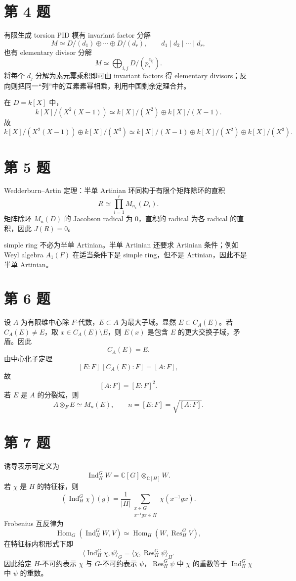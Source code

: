 \documentclass[11pt]{article}
\begin{document}
\section*{第 4 题}

有限生成 torsion PID 模有 invariant factor 分解
\[
  M\simeq D/(d_1)\oplus\cdots\oplus D/(d_r),
  \qquad d_1\mid d_2\mid\cdots\mid d_r,
\]
也有 elementary divisor 分解
\[
  M\simeq \bigoplus_{i,j}D/(p_i^{e_{ij}}).
\]
将每个 \(d_j\) 分解为素元幂乘积即可由 invariant factors 得 elementary divisors；反向则把同一“列”中的互素素幂相乘，利用中国剩余定理合并。

在 \(D=k[X]\) 中，
\[
  k[X]/(X^2(X-1))\simeq k[X]/(X^2)\oplus k[X]/(X-1).
\]
故
\[
  k[X]/(X^2(X-1))\oplus k[X]/(X^3)
  \simeq k[X]/(X-1)\oplus k[X]/(X^2)\oplus k[X]/(X^3).
\]

\section*{第 5 题}

Wedderburn--Artin 定理：半单 Artinian 环同构于有限个矩阵除环的直积
\[
  R\simeq \prod_{i=1}^r M_{n_i}(D_i).
\]
矩阵除环 \(M_n(D)\) 的 Jacobson radical 为 \(0\)，直积的 radical 为各 radical 的直积，因此 \(J(R)=0\)。

simple ring 不必为半单 Artinian。半单 Artinian 还要求 Artinian 条件；例如 Weyl algebra \(A_1(F)\) 在适当条件下是 simple ring，但不是 Artinian，因此不是半单 Artinian。

\section*{第 6 题}

设 \(A\) 为有限维中心除 \(F\)-代数，\(E\subset A\) 为最大子域。显然 \(E\subset C_A(E)\)。若 \(C_A(E)\neq E\)，取 \(x\in C_A(E)\setminus E\)，则 \(E(x)\) 是包含 \(E\) 的更大交换子域，矛盾。因此
\[
  C_A(E)=E.
\]
由中心化子定理
\[
  [E:F]\,[C_A(E):F]=[A:F],
\]
故
\[
  [A:F]=[E:F]^2.
\]
若 \(E\) 是 \(A\) 的分裂域，则
\[
  A\otimes_F E\simeq M_n(E),
  \qquad n=[E:F]=\sqrt{[A:F]}.
\]

\section*{第 7 题}

诱导表示可定义为
\[
  \operatorname{Ind}_H^G W=\mathbb C[G]\otimes_{\mathbb C[H]}W.
\]
若 \(\chi\) 是 \(H\) 的特征标，则
\[
  (\operatorname{Ind}_H^G\chi)(g)
  =\frac{1}{|H|}\sum_{\substack{x\in G\\x^{-1}gx\in H}}
  \chi(x^{-1}gx).
\]
Frobenius 互反律为
\[
  \operatorname{Hom}_G(\operatorname{Ind}_H^G W,V)
  \simeq
  \operatorname{Hom}_H(W,\operatorname{Res}_H^G V),
\]
在特征标内积形式下即
\[
  \langle \operatorname{Ind}_H^G\chi,\psi\rangle_G
  =
  \langle \chi,\operatorname{Res}_H^G\psi\rangle_H.
\]
因此给定 \(H\)-不可约表示 \(\chi\) 与 \(G\)-不可约表示 \(\psi\)，\(\operatorname{Res}_H^G\psi\) 中 \(\chi\) 的重数等于 \(\operatorname{Ind}_H^G\chi\) 中 \(\psi\) 的重数。
\end{document}
